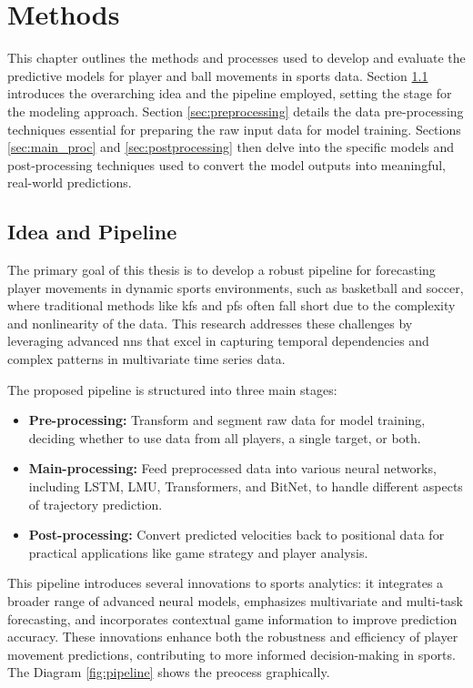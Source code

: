 \chapter{Methods}
\label{chapt:method}

This chapter outlines the methods and processes used to develop and evaluate the predictive models for player and ball movements in sports data. Section \ref{sec:idea_pipeline} introduces the overarching idea and the pipeline employed, setting the stage for the modeling approach. Section \ref{sec:preprocessing} details the data pre-processing techniques essential for preparing the raw input data for model training. Sections \ref{sec:main_proc} and \ref{sec:postprocessing} then delve into the specific models and post-processing techniques used to convert the model outputs into meaningful, real-world predictions.

\section{Idea and Pipeline}
\label{sec:idea_pipeline}
The primary goal of this thesis is to develop a robust pipeline for forecasting player movements in dynamic sports environments, such as basketball and soccer, where traditional methods like \glspl{kf} and \glspl{pf} often fall short due to the complexity and nonlinearity of the data. This research addresses these challenges by leveraging advanced \glspl{nn} that excel in capturing temporal dependencies and complex patterns in multivariate time series data.

The proposed pipeline is structured into three main stages:
\begin{itemize}
    \item \textbf{Pre-processing:} Transform and segment raw data for model training, deciding whether to use data from all players, a single target, or both.
    \item \textbf{Main-processing:} Feed preprocessed data into various neural networks, including LSTM, LMU, Transformers, and BitNet, to handle different aspects of trajectory prediction.
    \item \textbf{Post-processing:} Convert predicted velocities back to positional data for practical applications like game strategy and player analysis.
\end{itemize}


This pipeline introduces several innovations to sports analytics: it integrates a broader range of advanced neural models, emphasizes multivariate and multi-task forecasting, and incorporates contextual game information to improve prediction accuracy. These innovations enhance both the robustness and efficiency of player movement predictions, contributing to more informed decision-making in sports. The Diagram \ref{fig:pipeline} shows the preocess graphically.

